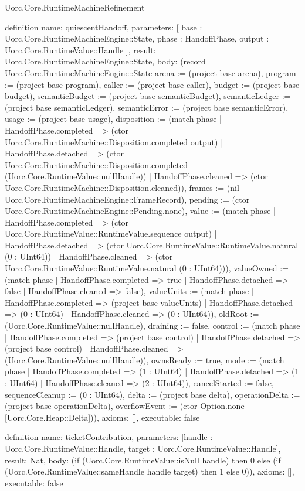 \begin{lexlean}{Uorc.Core.RuntimeMachineRefinement}
\begin{semanticmodule}
definition{
  name: quiescentHandoff,
  parameters: [
    base : Uorc.Core.RuntimeMachineEngine::State,
    phase : HandoffPhase,
    output : Uorc.Core.RuntimeValue::Handle
  ],
  result: Uorc.Core.RuntimeMachineEngine::State,
  body: (record Uorc.Core.RuntimeMachineEngine::State {arena := (project base arena), program := (project base program), caller := (project base caller), budget := (project base budget), semanticBudget := (project base semanticBudget), semanticLedger := (project base semanticLedger), semanticError := (project base semanticError), usage := (project base usage), disposition := (match phase
    | HandoffPhase.completed => (ctor Uorc.Core.RuntimeMachine::Disposition.completed output)
    | HandoffPhase.detached => (ctor Uorc.Core.RuntimeMachine::Disposition.completed (Uorc.Core.RuntimeValue::nullHandle))
    | HandoffPhase.cleaned => (ctor Uorc.Core.RuntimeMachine::Disposition.cleaned)), frames := (nil Uorc.Core.RuntimeMachineEngine::FrameRecord), pending := (ctor Uorc.Core.RuntimeMachineEngine::Pending.none), value := (match phase
    | HandoffPhase.completed => (ctor Uorc.Core.RuntimeValue::RuntimeValue.sequence output)
    | HandoffPhase.detached => (ctor Uorc.Core.RuntimeValue::RuntimeValue.natural (0 : UInt64))
    | HandoffPhase.cleaned => (ctor Uorc.Core.RuntimeValue::RuntimeValue.natural (0 : UInt64))), valueOwned := (match phase
    | HandoffPhase.completed => true
    | HandoffPhase.detached => false
    | HandoffPhase.cleaned => false), valueUnits := (match phase
    | HandoffPhase.completed => (project base valueUnits)
    | HandoffPhase.detached => (0 : UInt64)
    | HandoffPhase.cleaned => (0 : UInt64)), oldRoot := (Uorc.Core.RuntimeValue::nullHandle), draining := false, control := (match phase
    | HandoffPhase.completed => (project base control)
    | HandoffPhase.detached => (project base control)
    | HandoffPhase.cleaned => (Uorc.Core.RuntimeValue::nullHandle)), ownsReady := true, mode := (match phase
    | HandoffPhase.completed => (1 : UInt64)
    | HandoffPhase.detached => (1 : UInt64)
    | HandoffPhase.cleaned => (2 : UInt64)), cancelStarted := false, sequenceCleanup := (0 : UInt64), delta := (project base delta), operationDelta := (project base operationDelta), overflowEvent := (ctor Option.none [Uorc.Core.Heap::Delta])}),
  axioms: [],
  executable: false
}

definition{
  name: ticketContribution,
  parameters: [handle : Uorc.Core.RuntimeValue::Handle, target : Uorc.Core.RuntimeValue::Handle],
  result: Nat,
  body: (if (Uorc.Core.RuntimeValue::isNull handle) then 0 else (if (Uorc.Core.RuntimeValue::sameHandle handle target) then 1 else 0)),
  axioms: [],
  executable: false
}


\end{semanticmodule}
\end{lexlean}
